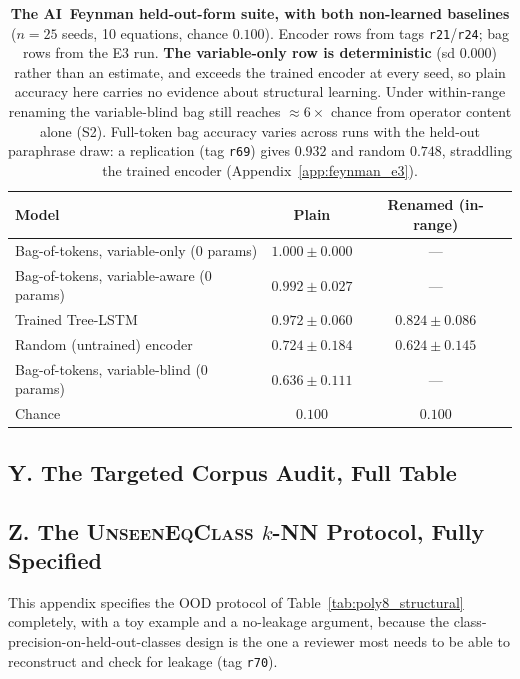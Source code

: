 \begin{table}[t]
\centering
\caption{\textbf{The AI~Feynman held-out-form suite, with both non-learned baselines} ($n{=}25$ seeds, 10 equations, chance $0.100$). Encoder rows from tags \texttt{r21}/\texttt{r24}; bag rows from the E3 run. \textbf{The variable-only row is deterministic} (sd $0.000$) rather than an estimate, and exceeds the trained encoder at every seed, so plain accuracy here carries no evidence about structural learning. Under within-range renaming the variable-blind bag still reaches ${\approx}6\times$ chance from operator content alone (S2). Full-token bag accuracy varies across runs with the held-out paraphrase draw: a replication (tag \texttt{r69}) gives $0.932$ and random $0.748$, straddling the trained encoder (Appendix~\ref{app:feynman_e3}).}
\label{tab:held_out_form}
\begin{tabular}{l cc}
\toprule
Model & Plain & Renamed (in-range) \\
\midrule
Bag-of-tokens, variable-only (0 params)  & $\mathbf{1.000 \pm 0.000}$ & --- \\
Bag-of-tokens, variable-aware (0 params) & $0.992 \pm 0.027$ & --- \\
Trained Tree-LSTM                        & $0.972 \pm 0.060$ & $0.824 \pm 0.086$ \\
Random (untrained) encoder               & $0.724 \pm 0.184$ & $0.624 \pm 0.145$ \\
Bag-of-tokens, variable-blind (0 params) & $0.636 \pm 0.111$ & --- \\
\midrule
Chance                                   & $0.100$ & $0.100$ \\
\bottomrule
\end{tabular}
\end{table}

\FloatBarrier
\subsection*{Y. The Targeted Corpus Audit, Full Table}



\FloatBarrier
\subsection*{Z. The \textsc{UnseenEqClass} $k$-NN Protocol, Fully Specified}

This appendix specifies the OOD protocol of Table~\ref{tab:poly8_structural} completely, with a toy example and a no-leakage argument, because the class-precision-on-held-out-classes design is the one a reviewer most needs to be able to reconstruct and check for leakage (tag \texttt{r70}).

